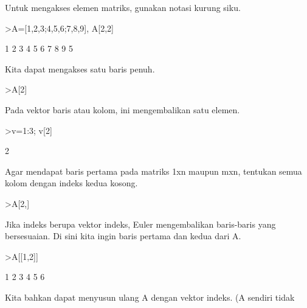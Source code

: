 \documentclass[a4paper,10pt]{article}
\begin{document}
\begin{eulernotebook}
\begin{eulercomment}
\begin{eulercomment}
\begin{eulercomment}
\begin{eulercomment}
\begin{eulercomment}
\begin{eulercomment}
\begin{eulercomment}
\begin{eulercomment}
\begin{eulercomment}
\begin{eulercomment}
\begin{eulercomment}
\begin{eulercomment}
\begin{eulercomment}
\begin{eulercomment}
\begin{eulercomment}
\begin{eulercomment}
\begin{eulercomment}
\begin{eulercomment}
\begin{eulercomment}
Untuk mengakses elemen matriks, gunakan notasi kurung siku.
\end{eulercomment}
\begin{eulerprompt}
>A=[1,2,3;4,5,6;7,8,9], A[2,2]
\end{eulerprompt}
\begin{euleroutput}
              1             2             3 
              4             5             6 
              7             8             9 
  5
\end{euleroutput}
\begin{eulercomment}
Kita dapat mengakses satu baris penuh.
\end{eulercomment}
\begin{eulerprompt}
>A[2]
\end{eulerprompt}
\begin{euleroutput}
  [4,  5,  6]
\end{euleroutput}
\begin{eulercomment}
Pada vektor baris atau kolom, ini mengembalikan satu elemen.
\end{eulercomment}
\begin{eulerprompt}
>v=1:3; v[2]
\end{eulerprompt}
\begin{euleroutput}
  2
\end{euleroutput}
\begin{eulercomment}
Agar mendapat baris pertama pada matriks 1xn maupun mxn, tentukan semua
kolom dengan indeks kedua kosong.
\end{eulercomment}
\begin{eulerprompt}
>A[2,]
\end{eulerprompt}
\begin{euleroutput}
  [4,  5,  6]
\end{euleroutput}
\begin{eulercomment}
Jika indeks berupa vektor indeks, Euler mengembalikan baris-baris yang
bersesuaian. Di sini kita ingin baris pertama dan kedua dari A.
\end{eulercomment}
\begin{eulerprompt}
>A[[1,2]]
\end{eulerprompt}
\begin{euleroutput}
              1             2             3 
              4             5             6 
\end{euleroutput}
\begin{eulercomment}
Kita bahkan dapat menyusun ulang A dengan vektor indeks. (A sendiri tidak

\end{eulercomment}
\end{eulercomment}
\end{eulercomment}
\end{eulercomment}
\end{eulercomment}
\end{eulercomment}
\end{eulercomment}
\end{eulercomment}
\end{eulercomment}
\end{eulercomment}
\end{eulercomment}
\end{eulercomment}
\end{eulercomment}
\end{eulercomment}
\end{eulercomment}
\end{eulercomment}
\end{eulercomment}
\end{eulercomment}
\end{eulercomment}
\end{eulernotebook}
\end{document}
